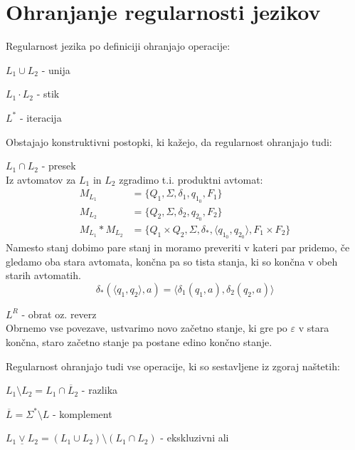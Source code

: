 \documentclass[10pt,a4paper,oneside]{book}
\begin{document}
\section{Ohranjanje regularnosti jezikov}
Regularnost jezika po definiciji ohranjajo operacije:
\begin{items}
\item $L_1 \cup L_2$ - unija 
\item $L_1 \cdot L_2$ - stik 
\item $L^*$ - iteracija
\end{items}
Obstajajo konstruktivni postopki, ki kažejo, da regularnost ohranjajo tudi:
\begin{items}
\item $L_1 \cap L_2$ - presek\\
	Iz avtomatov za $L_1$ in $L_2$ zgradimo t.i. produktni avtomat:
		\begin{align*}
			M_{L_1} &= \{ Q_1, \Sigma, \delta_1, q_{1_0}, F_1 \}\\
			M_{L_2} &= \{ Q_2, \Sigma, \delta_2, q_{2_0}, F_2 \}\\
			M_{L_1}*M_{L_2} &= \{ Q_1 \times Q_2, \Sigma, \delta_*, \langle q_{1_0}, q_{2_0} \rangle, F_1 \times F_2 \}
		\end{align*}
	Namesto stanj dobimo pare stanj in moramo preveriti v kateri par pridemo, če gledamo oba stara avtomata, končna pa so tista stanja, ki so končna v obeh starih avtomatih.
	\begin{displaymath}
		\delta_*(\langle q_1, q_2 \rangle, a) = \langle \delta_1(q_1, a), \delta_2(q_2, a)\rangle
	\end{displaymath}
\item $L^R$ - obrat oz. reverz\\
	Obrnemo vse povezave, ustvarimo novo začetno stanje, ki gre po $\varepsilon$ v stara končna, staro začetno stanje pa postane edino končno stanje.
\end{items}
Regularnost ohranjajo tudi vse operacije, ki so sestavljene iz zgoraj naštetih:
\begin{items}
\item $L_1 \setminus L_2 = L_1 \cap \overline L_2$ - razlika
\item $\overline{L} = \Sigma^* \setminus L$ - komplement
\item $L_1 \underline\vee L_2 = (L_1 \cup L_2) \setminus (L_1 \cap L_2)$ - ekskluzivni ali 
\end{items}
\end{document}
